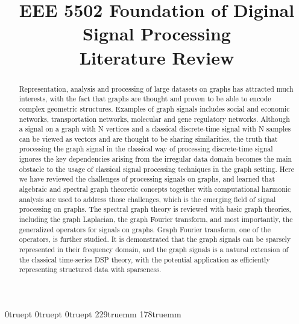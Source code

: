 \documentclass[conference]{IEEEtran}
\begin{document}
\topmargin 0truept
\headheight 0truept
\headsep 0truept
\textheight 229truemm
\textwidth 178truemm
\title{EEE 5502 Foundation of Diginal Signal Processing\\ Literature Review\\
}

\author{
}

\maketitle

\begin{abstract}
Representation, analysis and processing of large datasets on graphs has attracted much interests, with the fact that graphs are thought and proven to be able to encode complex geometric structures. Examples of graph signals includes social and economic networks, transportation networks, molecular and gene regulatory networks. Although a signal on a graph with N vertices and a classical discrete-time signal with N samples can be viewed as vectors and are thought to be sharing similarities, the truth that processing the graph signal in the classical way of processing discrete-time signal ignores the key dependencies arising from the irregular data domain becomes the main obstacle to the usage of classical signal processing techniques in the graph setting. Here we have reviewed the challenges of processing signals on graphs, and learned that algebraic and spectral graph theoretic concepts together with computational harmonic analysis are used to address those challenges, which is the emerging field of signal processing on graphs. The spectral graph theory is reviewed with basic graph theories, including the graph Laplacian, the graph Fourier transform, and most importantly, the generalized operators for signals on graphs. Graph Fourier transform, one of the operators, is further studied. It is demonstrated that the graph signals can be sparsely represented in their frequency domain, and the graph signals is a natural extension of the classical time-series DSP theory, with the potential application as efficiently representing structured data with sparseness. 
\end{abstract}
\end{document}
